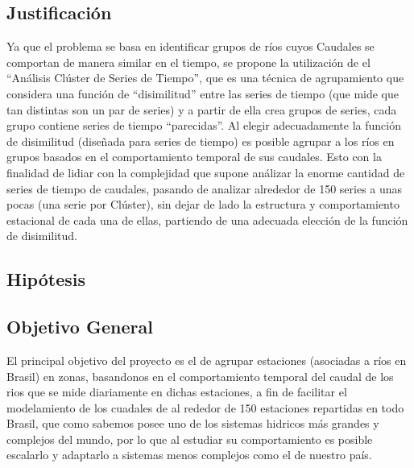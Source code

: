\documentclass[10pt,a4paper]{article}
\begin{document}
\subsection{Justificación}
Ya que el problema se basa en identificar grupos de ríos cuyos Caudales se comportan de manera similar en el tiempo, se propone la utilización de el “Análisis Clúster de Series de Tiempo”, que es una técnica de agrupamiento que considera una función de “disimilitud” entre las series de tiempo (que mide que tan distintas son un par de series) y a partir de ella crea grupos de series, cada grupo contiene series de tiempo “parecidas”. Al elegir adecuadamente la función de disimilitud (diseñada para series de tiempo) es posible agrupar a los ríos en grupos basados en el comportamiento temporal de sus caudales. Esto con la finalidad de lidiar con la complejidad que supone análizar la enorme cantidad de series de tiempo de caudales, pasando de analizar alrededor de 150 series a unas pocas (una serie por Clúster), sin dejar de lado la estructura y comportamiento estacional de cada una de ellas, partiendo de una adecuada elección de la función de disimilitud.

\subsection{Hipótesis}


\subsection{Objetivo General}
El principal objetivo del proyecto es el de agrupar estaciones (asociadas a ríos en Brasil) en zonas, basandonos en el comportamiento temporal del caudal de los rios que se mide diariamente en dichas estaciones, a fin de facilitar el modelamiento de los cuadales de al rededor de 150 estaciones repartidas en todo Brasil, que como sabemos posee uno de los sistemas hidricos más grandes y complejos del mundo, por lo que al estudiar su comportamiento es posible escalarlo y adaptarlo a sistemas menos complejos como el de nuestro país.
\end{document}

